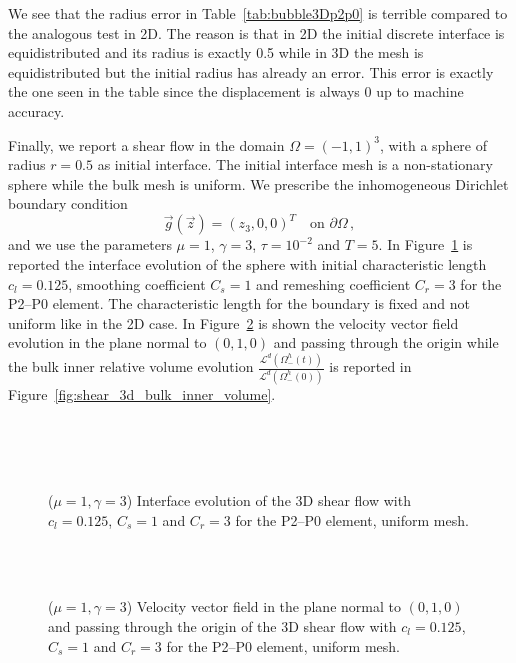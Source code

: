 \documentclass[a4paper,12pt,onecolumn]{article}
\begin{document}
We see that the radius error in Table~\ref{tab:bubble3Dp2p0} is terrible compared to the analogous test in 2D. The reason is that in 2D the initial discrete interface is equidistributed and its radius is exactly 0.5 while in 3D the mesh is equidistributed but the initial radius has already an error. This error is exactly the one seen in the table since the displacement is always 0 up to machine accuracy. 

Finally, we report a shear flow in the domain $\Omega=(-1,1)^3$, with a sphere of radius $r=0.5$ as initial interface. The initial interface mesh is a non-stationary sphere while the bulk mesh is uniform. We prescribe the inhomogeneous Dirichlet boundary condition
\begin{equation*}
\vec g(\vec z)=(z_3,0,0)^T\quad \mbox{on }\partial\Omega\,,
\end{equation*}
and we use the parameters $\mu=1$, $\gamma=3$, $\tau=10^{-2}$ and $T=5$. In Figure~\ref{fig:shear_3d} is reported the interface evolution of the sphere with initial characteristic length $c_l=0.125$, smoothing coefficient $C_s=1$ and remeshing coefficient $C_r=3$ for the P2--P0 element. The characteristic length for the boundary is fixed and not uniform like in the 2D case. In Figure~\ref{fig:shear_3d_velocity} is shown the velocity vector field evolution in the plane normal to $(0,1,0)$ and passing through the origin while the bulk inner relative volume evolution $\frac{\mathcal{L}^d(\Omega^h_-(t))}{\mathcal{L}^d(\Omega^h_-(0))}$ is reported in Figure~\ref{fig:shear_3d_bulk_inner_volume}.
\begin{figure}[htbp]
  \centering
  \\
  \quad
  \\
  \quad
  \\
  \caption{($\mu=1,\gamma=3$) Interface evolution of the 3D shear flow with $c_l=0.125$, $C_s=1$ and $C_r=3$ for the P2--P0 element, uniform mesh.}
  \label{fig:shear_3d}
\end{figure}

\begin{figure}[htbp]
  \centering
  \quad
  \\
  \quad
  \\
  \caption{($\mu=1,\gamma=3$) Velocity vector field in the plane normal to $(0,1,0)$ and passing through the origin of the 3D shear flow with $c_l=0.125$, $C_s=1$ and $C_r=3$ for the P2--P0 element, uniform mesh.}
  \label{fig:shear_3d_velocity}
\end{figure}
\end{document}
